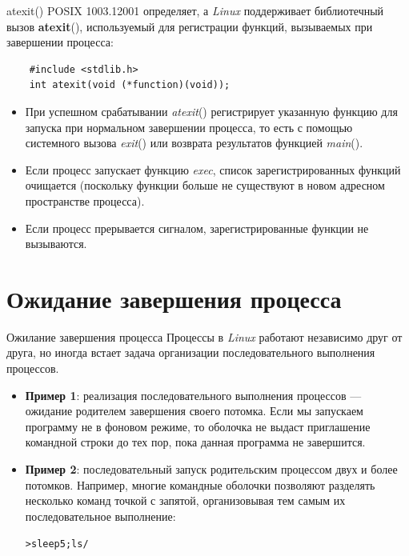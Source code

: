 \documentclass[xcolor=table]{beamer}
\begin{document}
\begin{frame}[fragile]{atexit()}
	POSIX 1003.1­2001 определяет, а \textit{Linux} поддерживает библиотечный вызов \textbf{atexit}(), используемый для регистрации функций, вызываемых при завершении процесса:
	\begin{verbatim}
	#include <stdlib.h>
	int atexit(void (*function)(void));
	\end{verbatim}
	\begin{itemize}
		\item При успешном срабатывании \textit{atexit}() регистрирует указанную функцию для запуска при нормальном завершении процесса, то есть с помощью системного вызова \textit{exit}() или возврата результатов функцией \textit{main}(). 
		\item Если процесс запускает функцию \textit{exec}, список зарегистрированных функций очищается (поскольку функции больше не существуют в новом адресном пространстве процесса). 
		\item Если процесс прерывается сигналом, зарегистрированные функции не вызываются.
	\end{itemize}
\end{frame}

\section{Ожидание завершения процесса}

\begin{frame}[fragile]{Ожилание завершения процесса}
	Процессы в \textit{Linux} работают независимо друг от друга, но иногда встает задача организации последовательного выполнения процессов.
	\begin{itemize}
		\item \textbf{Пример 1}: реализация последовательного выполнения процессов — ожидание родителем завершения своего потомка. Если мы запускаем программу не в фоновом режиме, то оболочка не выдаст приглашение командной строки до тех пор, пока данная программа не завершится.
		\item \textbf{Пример 2}: последовательный запуск родительским процессом двух и более потомков. Например, многие командные оболочки позволяют разделять несколько команд точкой с запятой, организовывая тем самым их последовательное выполнение: 
		\begin{alltt}
			> sleep 5 ; ls /
		\end{alltt}
\end{itemize}
\end{frame}
\end{document}
